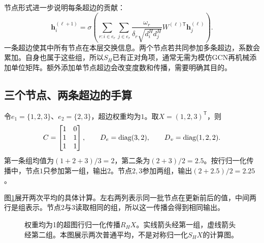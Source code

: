节点形式进一步说明每条超边的贡献：
\begin{equation}
 \bm h_i^{(\ell+1)}=\sigma\!\left(
 \sum_{r:i\in e_r}\sum_{j\in e_r}
 \frac{\omega_r}{\delta_r\sqrt{d_i^Hd_j^H}}
 W^{(\ell)\mathsf T}\bm h_j^{(\ell)}\right).
 \label{eq:graph-hyper-node}
\end{equation}
一条超边使其中所有节点在本层交换信息。两个节点若共同参加多条超边，系数会累加。自身也属于这些组，所以$S_H$已有正对角项，通常无需为模仿GCN再机械添加单位矩阵。额外添加单节点超边会改变度数和传播，需要明确其目的。

\subsection{三个节点、两条超边的手算}
令$e_1=\{1,2,3\}$、$e_2=\{2,3\}$，超边权重均为$1$。取$X=(1,2,3)^{\mathsf T}$，则
\begin{equation}
 C=\begin{bmatrix}1&0\\1&1\\1&1\end{bmatrix},\qquad
 D_e=\operatorname{diag}(3,2),\qquad D_v=\operatorname{diag}(1,2,2).
\end{equation}
第一条组均值为$(1+2+3)/3=2$，第二条为$(2+3)/2=2.5$。按行归一化传播中，节点$1$只参加第一组，输出$2$。节点$2,3$参加两组，输出$(2+2.5)/2=2.25$。

图\ref{fig:graph-hyper-two-stage}展开两次平均的具体计算。左右两列表示同一批节点在更新前后的值，中间两行是组表示。节点$2$与$3$读取相同的组，所以这一传播会得到相同输出。
\begin{figure}[htbp]
\centering
{}
\caption{权重均为1的超图行归一化传播$R_HX$。实线箭头经第一组，虚线箭头经第二组。本图展示两次普通平均，不是对称归一化$S_HX$的计算图。}
\label{fig:graph-hyper-two-stage}
\end{figure}

